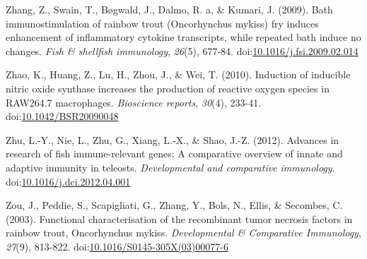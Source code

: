 \documentclass[12pt,letterpaper,oneside]{scrbook}
\begin{document}
Zhang, Z., Swain, T., Bøgwald, J., Dalmo, R. a, \& Kumari, J. (2009).
Bath immunostimulation of rainbow trout (Oncorhynchus mykiss) fry
induces enhancement of inflammatory cytokine transcripts, while repeated
bath induce no changes. \emph{Fish \& shellfish immunology},
\emph{26}(5), 677-84.
doi:\href{http://dx.doi.org/10.1016/j.fsi.2009.02.014}{10.1016/j.fsi.2009.02.014}

Zhao, K., Huang, Z., Lu, H., Zhou, J., \& Wei, T. (2010). Induction of
inducible nitric oxide synthase increases the production of reactive
oxygen species in RAW264.7 macrophages. \emph{Bioscience reports},
\emph{30}(4), 233-41.
doi:\href{http://dx.doi.org/10.1042/BSR20090048}{10.1042/BSR20090048}

Zhu, L.-Y., Nie, L., Zhu, G., Xiang, L.-X., \& Shao, J.-Z. (2012).
Advances in research of fish immune-relevant genes: A comparative
overview of innate and adaptive immunity in teleosts.
\emph{Developmental and comparative immunology}.
doi:\href{http://dx.doi.org/10.1016/j.dci.2012.04.001}{10.1016/j.dci.2012.04.001}

Zou, J., Peddie, S., Scapigliati, G., Zhang, Y., Bols, N., Ellis, \&
Secombes, C. (2003). Functional characterisation of the recombinant
tumor necrosis factors in rainbow trout, Oncorhynchus mykiss.
\emph{Developmental \& Comparative Immunology}, \emph{27}(9), 813-822.
doi:\href{http://dx.doi.org/10.1016/S0145-305X(03)00077-6}{10.1016/S0145-305X(03)00077-6}
\end{document}

